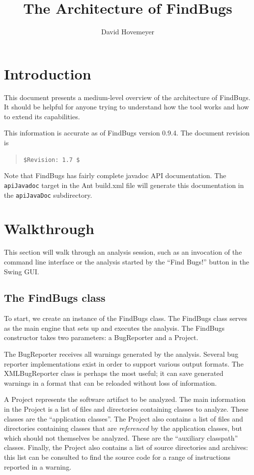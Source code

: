 \documentclass[11pt]{article}
\title{The Architecture of FindBugs}
\author{David Hovemeyer}
\date{}
\begin{document}
\maketitle
\tableofcontents

\section*{Introduction}

This document presents a medium-level overview of the architecture
of FindBugs.  It should be helpful for anyone trying to understand how
the tool works and how to extend its capabilities.

This information is accurate as of FindBugs version 0.9.4.
The document revision is
\begin{quote}
\verb+$Revision: 1.7 $+
\end{quote}

Note that FindBugs has fairly complete javadoc API documentation.
The {\tt apiJavadoc} target in the Ant build.xml file will generate
this documentation in the {\tt apiJavaDoc} subdirectory.

\section{Walkthrough}

This section will walk through an analysis session,
such as an invocation of the command line interface or the analysis
started by the ``Find Bugs!'' button in the Swing GUI.

\subsection{The FindBugs class}

To start, we create an instance of the FindBugs class.
The FindBugs class serves as the main engine that sets up and executes the
analysis.  The FindBugs constructor takes
two parameters: a BugReporter and a Project.

The BugReporter receives all warnings generated by the analysis.
Several bug reporter implementations exist in order to support various
output formats.  The XMLBugReporter class is perhaps the most useful;
it can save generated warnings in a format that can be reloaded without
loss of information.  

A Project represents the software artifact to be analyzed.
The main information in the Project is a list of files and directories
containing classes to analyze.  These classes are the ``application classes''.
The Project also contains a list of
files and directories containing classes that are {\em referenced}
by the application classes, but which should not themselves be analyzed.
These are the ``auxiliary classpath'' classes.  Finally, the Project also contains
a list of source directories and archives: this list can be consulted to
find the source code for a range of instructions reported in a warning.
\end{document}
